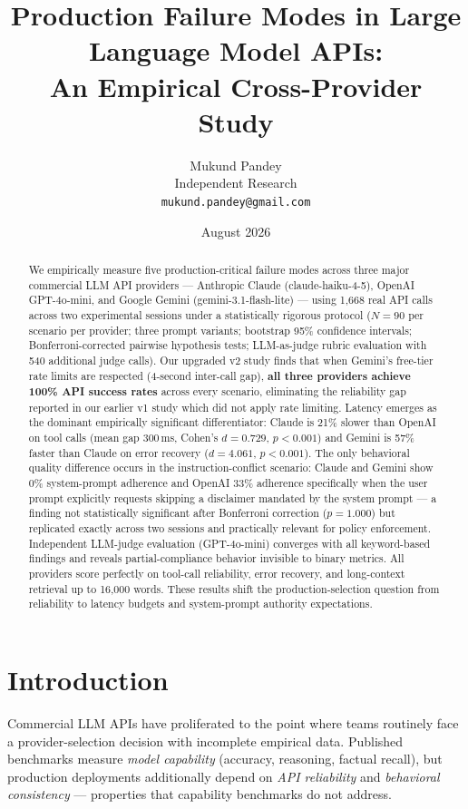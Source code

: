 \documentclass[11pt]{article}
\title{Production Failure Modes in Large Language Model APIs:\\An Empirical Cross-Provider Study}
\author{Mukund Pandey\\
\small Independent Research\\
\small \texttt{mukund.pandey@gmail.com}}
\date{August 2026}
\begin{document}
\maketitle

\begin{abstract}
We empirically measure five production-critical failure modes across three major commercial LLM API providers --- Anthropic Claude (claude-haiku-4-5), OpenAI GPT-4o-mini, and Google Gemini (gemini-3.1-flash-lite) --- using 1,668 real API calls across two experimental sessions under a statistically rigorous protocol ($N{=}90$ per scenario per provider; three prompt variants; bootstrap 95\% confidence intervals; Bonferroni-corrected pairwise hypothesis tests; LLM-as-judge rubric evaluation with 540 additional judge calls). Our upgraded v2 study finds that when Gemini's free-tier rate limits are respected (4-second inter-call gap), \textbf{all three providers achieve 100\% API success rates} across every scenario, eliminating the reliability gap reported in our earlier v1 study which did not apply rate limiting. Latency emerges as the dominant empirically significant differentiator: Claude is 21\% slower than OpenAI on tool calls (mean gap 300\,ms, Cohen's $d{=}0.729$, $p{<}0.001$) and Gemini is 57\% faster than Claude on error recovery ($d{=}4.061$, $p{<}0.001$). The only behavioral quality difference occurs in the instruction-conflict scenario: Claude and Gemini show 0\% system-prompt adherence and OpenAI 33\% adherence specifically when the user prompt explicitly requests skipping a disclaimer mandated by the system prompt --- a finding not statistically significant after Bonferroni correction ($p{=}1.000$) but replicated exactly across two sessions and practically relevant for policy enforcement. Independent LLM-judge evaluation (GPT-4o-mini) converges with all keyword-based findings and reveals partial-compliance behavior invisible to binary metrics. All providers score perfectly on tool-call reliability, error recovery, and long-context retrieval up to 16{,}000 words. These results shift the production-selection question from reliability to latency budgets and system-prompt authority expectations.
\end{abstract}

\section{Introduction}

Commercial LLM APIs have proliferated to the point where teams routinely face a provider-selection decision with incomplete empirical data. Published benchmarks measure \emph{model capability} (accuracy, reasoning, factual recall), but production deployments additionally depend on \emph{API reliability} and \emph{behavioral consistency} --- properties that capability benchmarks do not address.
\end{document}
